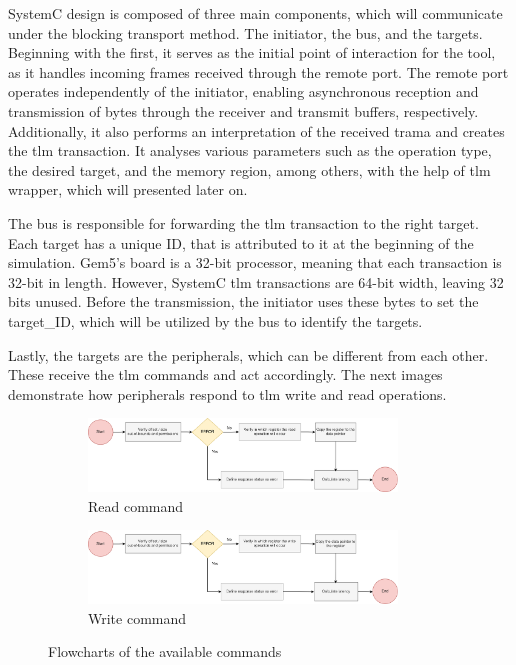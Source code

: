 SystemC design is composed of three main components, which will communicate under the blocking transport method. 
The initiator, the bus, and the targets.
Beginning with the first, it serves as the initial 
point of interaction for the tool, as it handles incoming frames received through the remote port. The remote port operates independently 
of the initiator, enabling asynchronous reception and transmission of bytes through the receiver and transmit buffers, respectively.
Additionally, it also performs an interpretation of the received trama and creates the \gls{tlm} transaction. It analyses various 
parameters such as the operation type, the desired target, and the memory region, among others, with the help of \gls{tlm} wrapper, 
which will presented later on.

The bus is responsible for forwarding the \gls{tlm} transaction to the right target. Each target has a unique ID, that is attributed to it 
at the beginning of the simulation. Gem5's board is a 32-bit processor, meaning that each transaction is 32-bit in length. However, SystemC 
\gls{tlm} transactions are 64-bit width, leaving 32 bits unused. Before the transmission, the initiator uses these bytes to set the 
target\_ID, which will be utilized by the bus to identify the targets.

Lastly, the targets are the peripherals, which can be different from each other. These receive the 
\gls{tlm} commands and act accordingly. The next images demonstrate how peripherals respond to \gls{tlm} write and read operations. 

\begin{figure}[H]
	\centering
	\begin{subfigure}{\textwidth}
		\centering
		\includegraphics[width=0.9\textwidth]{Images/CoSimReadOperation.png}
 		\caption[1\textwidth]{Read command}
	\end{subfigure}
	\begin{subfigure}{\textwidth}
		\centering
		\includegraphics[width=0.9\textwidth]{Images/CoSimWriteOperation.png}
		\caption[1\textwidth]{Write command}
	\end{subfigure}
		
	\caption{Flowcharts of the available commands}
\end{figure}

